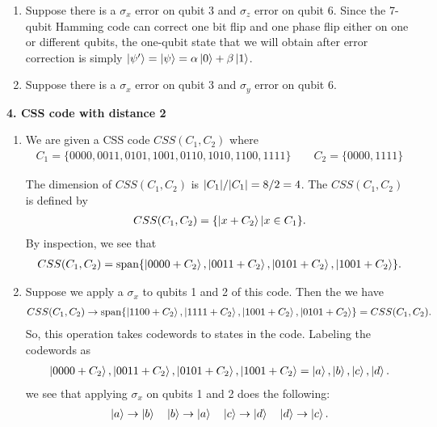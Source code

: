 \documentclass{article}
\theoremstyle{definition}
\newcommand{\al}{\alpha}
\newcommand{\be}{\beta}
\begin{document}
\begin{enumerate}[label=(\alph*)]
	\item Suppose there is a $\sigma_x$ error on qubit 3 and $\sigma_z$ error on qubit 6. Since the 7-qubit Hamming code can correct one bit flip and one phase flip either on one or different qubits, the one-qubit state that we will obtain after error correction is simply $\ket{\psi'} = \ket{\psi} = \al\ket{0} + \be\ket{1}$.
	
	\item Suppose there is a $\sigma_x$ error on qubit 3 and $\sigma_y$ error on qubit 6. 
	
\end{enumerate}


\noindent \textbf{4. CSS code with distance 2}

\begin{enumerate}[label=(\alph*)]
	\item We are given a CSS code $CSS(C_1,C_2)$ where
	\begin{align*}
		C_1 = \{ 0000,0011,0101,1001,0110,1010,1100,1111  \} \quad\quad C_2 = \{ 0000, 1111 \}
	\end{align*}
	
	The dimension of $CSS(C_1,C_2)$ is $\abs{C_1}/\abs{C_1} = 8/2 = 4$. The $CSS(C_1, C_2)$ is defined by 
	\begin{align*}
		CSS(C_1, C_2) =  \{ \ket{x+C_2}  \vert x\in C_1 \}.
	\end{align*}
	By inspection, we see that
	\begin{align*}
		CSS(C_1,C_2) = \text{span}\{ \ket{0000+C_2} , \ket{0011+C_2} , \ket{0101+C_2} , \ket{1001+C_2}   \}.
	\end{align*}
	
	
	\item Suppose we apply a $\sigma_x$ to qubits 1 and 2 of this code. Then the we have 
	\begin{align*}
		CSS(C_1,C_2) \to \text{span} \{ \ket{1100+C_2} , \ket{1111+C_2} , \ket{1001+C_2} , \ket{0101+C_2}   \} = CSS(C_1,C_2).
	\end{align*}
	So, this operation takes codewords to states in the code. Labeling the codewords as 
	\begin{align*}
		 \ket{0000+C_2} , \ket{0011+C_2} , \ket{0101+C_2} , \ket{1001+C_2}    =  \ket{a}, \ket{b}, \ket{c}, \ket{d} .
	\end{align*}
	we see that applying $\sigma_x$ on qubits 1 and 2 does the following:
	\begin{align*}
		\ket{a} \to \ket{b} \quad \ket{b} \to \ket{a} \quad \ket{c} \to \ket{d} \quad \ket{d} \to \ket{c}.
	\end{align*}
	

\end{enumerate}
\end{document}
